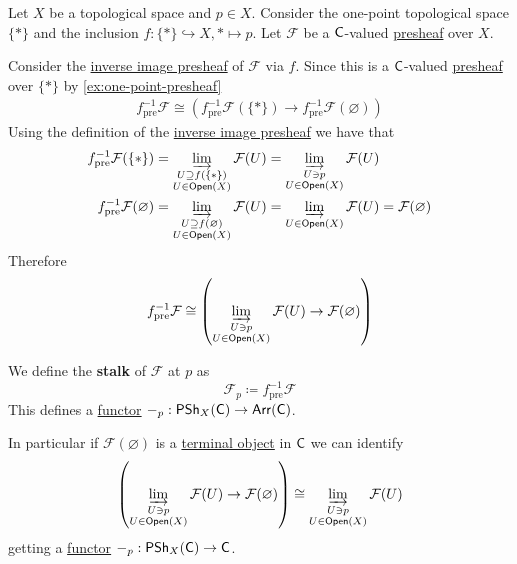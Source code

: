 \documentclass[../../../main]{subfiles}
\begin{document}
\begin{example}[Stalk]\label{ex:stalk-presheaf}
  Let \(X\) be a topological space and \(p \in X\).
  Consider the one-point topological space \(\{\ast\}\) and the inclusion \(f: \{\ast\} \hookrightarrow X, \ast \mapsto p\).
  Let \(\mathcal{F}\) be a \(\mathsf{C}\)-valued \hyperref[def:presheaf]{presheaf} over \(X\).

  Consider the \hyperref[def:inverse-image-presheaf]{inverse image presheaf} of \(\mathcal{F}\) via \(f\).
  Since this is a \(\mathsf{C}\)-valued \hyperref[def:presheaf]{presheaf} over \(\{\ast\}\) by \autoref{ex:one-point-presheaf}
  \begin{align*}
    f_{\operatorname{pre}}^{-1} \mathcal{F} \cong \left( f_{\operatorname{pre}}^{-1}\mathcal{F}(\{\ast\}) \to f_{\operatorname{pre}}^{-1}\mathcal{F}(\varnothing) \right)
  \end{align*}
  Using the definition of the \hyperref[def:inverse-image-presheaf]{inverse image presheaf} we have that
  \begin{align*}
    f_{\operatorname{pre}}^{-1}\mathcal{F}(\{\ast\}) &= \varinjlim_{\substack{U \supseteq f(\{\ast\}) \\ U \in \mathsf{Open}(X)}} \mathcal{F}(U) = \varinjlim_{\substack{U \ni p \\ U \in \mathsf{Open}(X)}} \mathcal{F}(U) \\
    f_{\operatorname{pre}}^{-1}\mathcal{F}(\varnothing) &= \varinjlim_{\substack{U \supseteq f(\varnothing) \\ U \in \mathsf{Open}(X)}} \mathcal{F}(U) = \varinjlim_{\substack{U \in \mathsf{Open}(X)}} \mathcal{F}(U) = \mathcal{F}(\varnothing)
  \end{align*}
  Therefore
  \begin{align*}
    f_{\operatorname{pre}}^{-1} \mathcal{F} \cong \left( \varinjlim_{\substack{U \ni p \\ U \in \mathsf{Open}(X)}} \mathcal{F}(U) \to \mathcal{F}(\varnothing) \right)
  \end{align*}

  We define the \textbf{stalk} of \(\mathcal{F}\) at \(p\) as
  \begin{equation*}
    \mathcal{F}_{p} \coloneq f_{\operatorname{pre}}^{-1}\mathcal{F}
  \end{equation*}
  This defines a \hyperref[def:functor]{functor} \(-_{p}: \mathsf{PSh}_{X}(\mathsf{C}) \to \mathsf{Arr}(\mathsf{C})\).

  In particular if \(\mathcal{F}(\varnothing)\) is a \hyperref[def:initial-terminal-object]{terminal object} in \(\mathsf{C}\) we can identify
  \begin{equation*}
    \left(\varinjlim_{\substack{U \ni p \\ U \in \mathsf{Open}(X)}} \mathcal{F}(U) \to \mathcal{F}(\varnothing) \right) \cong \varinjlim_{\substack{U \ni p \\ U \in \mathsf{Open}(X)}} \mathcal{F}(U)
  \end{equation*}
  getting a \hyperref[def:functor]{functor} \(-_{p}: \mathsf{PSh}_{X}(\mathsf{C}) \to \mathsf{C}\).
\end{example}
\end{document}
